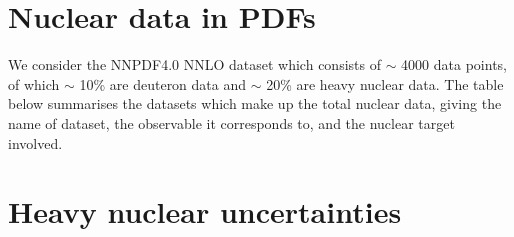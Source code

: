 \section{Nuclear data in PDFs}
\label{sec:nucdat}
We consider the NNPDF4.0 NNLO dataset which consists of $\sim$ 4000 data points, of which $\sim$ 10\% are deuteron data and $\sim$ 20\% are heavy nuclear data. The table below summarises the datasets which make up the total nuclear data, giving the name of dataset, the observable it corresponds to, and the nuclear target involved.
\begin{table}[h]
\centering
{}
\caption{The nuclear data in NNPDF4.0. The process (Deep inelastic scattering (DIS) charged current (CC), neutral current (NC) and Drell-Yan (DY) is displayed for each dataset, alongside the number of data ($N_{dat}$) and the target. \label{tab:nucdat}}
\end{table}
\section{Heavy nuclear uncertainties}
\label{sec:hnucunc}

